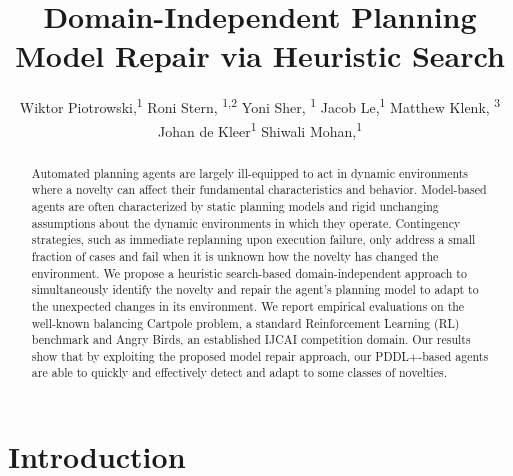 \documentclass[letterpaper]{article} %
\title{Domain-Independent Planning Model Repair via Heuristic Search}
\author {
    Wiktor Piotrowski,\textsuperscript{\rm 1}
    Roni Stern, \textsuperscript{\rm 1,2}
    Yoni Sher, \textsuperscript{\rm 1}
    Jacob Le,\textsuperscript{\rm 1}
    Matthew Klenk, \textsuperscript{\rm 3}
    Johan de Kleer\textsuperscript{\rm 1}
    Shiwali Mohan,\textsuperscript{\rm 1}
}
\begin{document}
\maketitle

\begin{abstract}
Automated planning agents are largely ill-equipped to act in dynamic environments where a novelty can affect their fundamental characteristics and behavior.
Model-based agents are often characterized by static planning models and rigid unchanging assumptions about the dynamic environments in which they operate. Contingency strategies, such as immediate replanning upon execution failure, only address a small fraction of cases and fail when it is unknown how the novelty has changed the environment. We propose a heuristic search-based domain-independent approach to simultaneously identify the novelty and repair the agent's planning model to adapt to the unexpected changes in its environment. We report empirical evaluations on the well-known balancing Cartpole problem, a standard Reinforcement Learning (RL) benchmark and Angry Birds, an established IJCAI competition domain. Our results show that by exploiting the proposed model repair approach, our PDDL+-based agents are able to quickly and effectively detect and adapt to some classes of novelties.
\end{abstract}

\section{Introduction}


\end{document}
